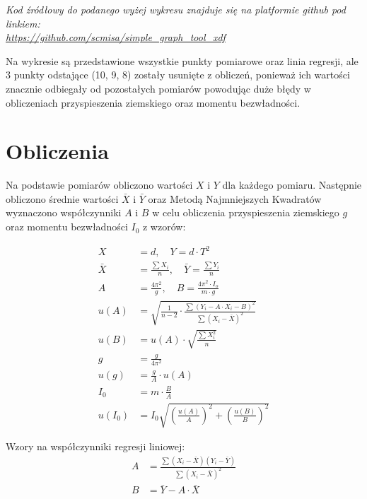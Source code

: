 \documentclass[12pt]{article}
\begin{document}
\begin{raggedright}
{\small \textit{Kod źródłowy do podanego wyżej wykresu znajduje się na platformie github pod linkiem: \\ 
\url{https://github.com/scmisa/simple_graph_tool_xdf}}}
\end{raggedright}

\normalsize\normalfont

Na wykresie są przedstawione wszystkie punkty pomiarowe oraz linia regresji,
ale 3 punkty odstające (10, 9, 8) zostały usunięte z obliczeń, 
ponieważ ich wartości znacznie odbiegały od pozostałych pomiarów
powodując duże błędy w obliczeniach przyspieszenia ziemskiego
oraz momentu bezwładności.

\clearpage

\section*{Obliczenia}
Na podstawie pomiarów obliczono wartości \( X \) i \( Y \) dla każdego pomiaru. 
Następnie obliczono średnie wartości \( \bar{X} \) i \( \bar{Y} \)
oraz Metodą Najmniejszych Kwadratów wyznaczono współczynniki \( A \) i \( B \)
w celu obliczenia przyspieszenia ziemskiego \( g \) oraz momentu bezwładności \( I_0 \)
z wzorów:

\begin{align*}
X &= d, \quad Y = d \cdot T^2 \\
\bar{X} &= \frac{\sum X_i}{n}, \quad \bar{Y} = \frac{\sum Y_i}{n} \\
A &= \frac{4\pi^2}{g} ,\quad B = \frac{4\pi^2 \cdot I_o}{m \cdot g} \\
u(A) &= \sqrt{\frac{1}{n-2} \cdot \frac{\sum (Y_i - A \cdot X_i - B)^2}{\sum (X_i - \bar{X})^2}} \\
u(B) &= u(A) \cdot \sqrt{\frac{\sum X_i^2}{n}} \\
g &= \frac{g}{4\pi^2} \\
u(g) &= \frac{g}{A} \cdot u(A) \\
I_0 &= m \cdot \frac{B}{A} \\
u(I_0) &= I_0 \sqrt{\left(\frac{u(A)}{A}\right)^2 + \left(\frac{u(B)}{B}\right)^2}
\end{align*}

Wzory na współczynniki regresji liniowej:
\begin{align*}
A &= \frac{\sum (X_i - \bar{X})(Y_i - \bar{Y})}{\sum (X_i - \bar{X})^2} \\
B &= \bar{Y} - A \cdot \bar{X} \\
\end{align*}
\end{document}
